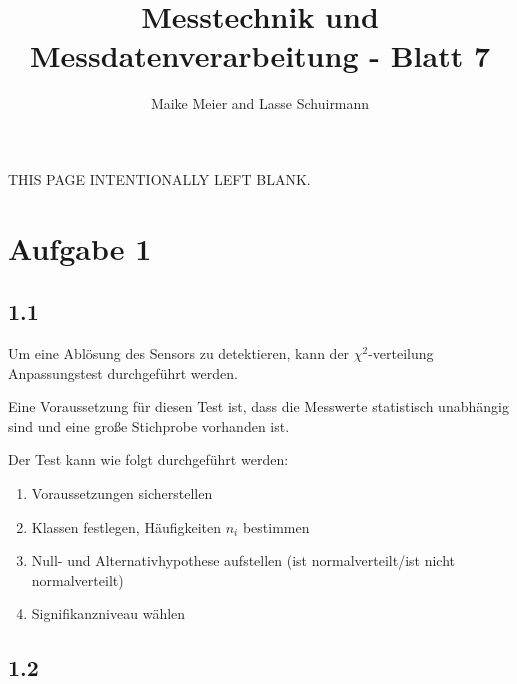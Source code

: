 \documentclass[12pt,a4paper]{article}
\author{Maike Meier and Lasse Schuirmann}
\title{Messtechnik und Messdatenverarbeitung - Blatt 7}
\newcommand*{\blankpage}{
  \vspace*{\fill}
  \begin{flushright}
  \tiny THIS PAGE INTENTIONALLY LEFT BLANK.
  \end{flushright}
  \pagebreak
}
\begin{document}

\maketitle
\pagebreak

\blankpage

\section*{Aufgabe 1}
\subsection*{1.1}
Um eine Ablösung des Sensors zu detektieren, kann der $\chi^2$-verteilung Anpassungstest durchgeführt werden.

Eine Voraussetzung für diesen Test ist, dass die Messwerte statistisch unabhängig sind und eine große Stichprobe vorhanden ist.

Der Test kann wie folgt durchgeführt werden:

\begin{enumerate}
\item Voraussetzungen sicherstellen
\item Klassen festlegen, Häufigkeiten $n_i$ bestimmen
\item Null- und Alternativhypothese aufstellen (ist normalverteilt/ist nicht normalverteilt)
\item Signifikanzniveau wählen
\end{enumerate}

\subsection*{1.2}
\end{document}
